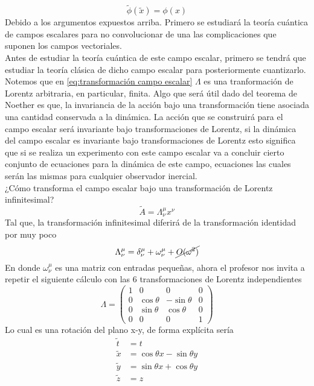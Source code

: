\documentclass[../main.tex]{subfiles}
\begin{document}
\begin{equation}
  \tilde{\phi}(\tilde{x}) = \phi(x)
\end{equation}
Debido a los argumentos expuestos arriba. Primero se estudiará la teoría cuántica de campos escalares para no convolucionar de una las complicaciones que suponen los campos vectoriales. \\
Antes de estudiar la teoría cuántica de este campo escalar, primero se tendrá que estudiar la teoría clásica de dicho campo escalar para posteriormente cuantizarlo. \\
Notemos que en \eqref{eq:transformación campo escalar} $\Lambda$ es una tranformación de Lorentz arbitraria, en particular, finita. Algo que será útil dado del teorema de Noether es que, la invariancia de la acción bajo una transformación tiene asociada una cantidad conservada a la dinámica. La acción que se construirá para el campo escalar será invariante bajo transformaciones de Lorentz, si la dinámica del campo escalar es invariante bajo transformaciones de Lorentz esto significa que si se realiza un experimento con este campo escalar va a concluir cierto conjunto de ecuaciones para la dinámica de este campo, ecuaciones las cuales serán las mismas para cualquier observador inercial. \\
¿Cómo transforma el campo escalar bajo una transformación de Lorentz infinitesimal?
\begin{equation*}
  \tilde{{A}} = \Lambda_\nu^\mu x^\nu 
\end{equation*}
Tal que, la transformación infinitesimal diferirá de la transformación identidad por muy poco
\begin{equation*}
  \Lambda_\nu^\mu = \delta_\nu^\mu + \omega_\nu^\mu + \cancel{O(\omega^2)}
\end{equation*}
En donde $\omega_\nu^\mu$ es una matriz con entradas pequeñas, ahora el profesor nos invita a repetir el siguiente cálculo con las 6 transformaciones de Lorentz independientes
\begin{equation*}
  \Lambda = \begin{pmatrix}
    1 & 0 & 0 & 0 \\
    0 & \cos{\theta} & -\sin{\theta} & 0 \\
    0 & \sin{\theta} & \cos{\theta} & 0 \\
    0 & 0 & 0 & 1
  \end{pmatrix}
\end{equation*}
Lo cual es una rotación del plano x-y, de forma explícita sería
\begin{align*}
  \tilde{t} & = t \\
  \tilde{x} & = \cos{\theta} x - \sin{\theta}y \\
  \tilde{{y}} & = \sin{\theta} x + \cos{\theta}y \\
  \tilde{z} & = z 
\end{align*}
\end{document}
